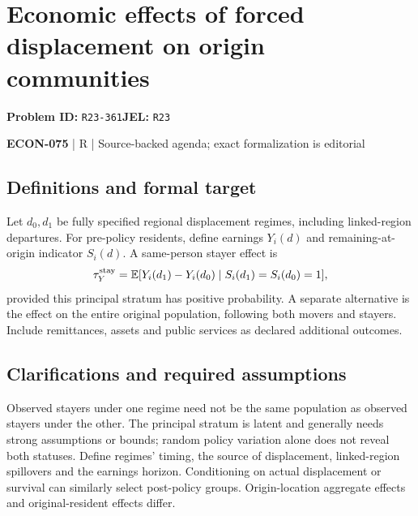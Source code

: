 \documentclass[11pt,a4paper]{article}
\begin{document}
\section*{Economic effects of forced displacement on origin communities}
\textbf{Problem ID:} \texttt{R23-361}\quad \textbf{JEL:} \texttt{R23}\par
\label{problem:OP-0641}


\label{audited:ECON-075}

{\sffamily\small\color{muted}\textbf{ECON-075} | R | Source-backed agenda; exact formalization is editorial\par}

\subsection*{Definitions and formal target}

Let \(d_0,d_1\) be fully specified regional displacement regimes, including linked-region departures. For pre-policy residents, define earnings \(Y_i(d)\) and remaining-at-origin indicator \(S_i(d)\). A same-person stayer effect is
\[
 \tau_Y^{\rm stay}
 =\mathbb E[Y_i(d_1)-Y_i(d_0)\mid S_i(d_1)=S_i(d_0)=1],
\]
provided this principal stratum has positive probability. A separate alternative is the effect on the entire original population, following both movers and stayers. Include remittances, assets and public services as declared additional outcomes.

\subsection*{Clarifications and required assumptions}

Observed stayers under one regime need not be the same population as observed stayers under the other. The principal stratum is latent and generally needs strong assumptions or bounds; random policy variation alone does not reveal both statuses. Define regimes' timing, the source of displacement, linked-region spillovers and the earnings horizon. Conditioning on actual displacement or survival can similarly select post-policy groups. Origin-location aggregate effects and original-resident effects differ.
\end{document}

